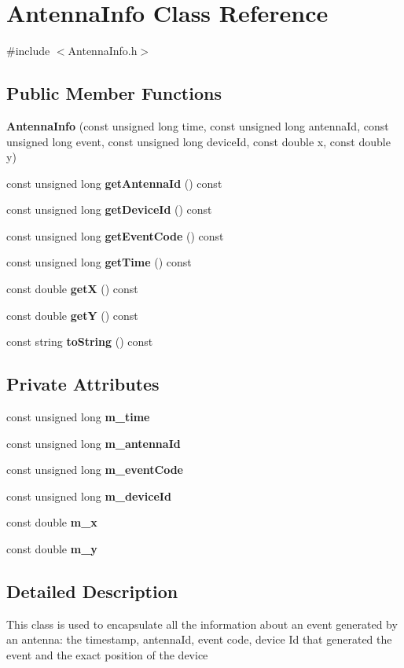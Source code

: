 \section{Antenna\+Info Class Reference}
\label{class_antenna_info}


{\ttfamily \#include $<$Antenna\+Info.\+h$>$}

\subsection*{Public Member Functions}
\begin{DoxyCompactItemize}
\item 
\textbf{ Antenna\+Info} (const unsigned long time, const unsigned long antenna\+Id, const unsigned long event, const unsigned long device\+Id, const double x, const double y)
\item 
const unsigned long \textbf{ get\+Antenna\+Id} () const
\item 
const unsigned long \textbf{ get\+Device\+Id} () const
\item 
const unsigned long \textbf{ get\+Event\+Code} () const
\item 
const unsigned long \textbf{ get\+Time} () const
\item 
const double \textbf{ getX} () const
\item 
const double \textbf{ getY} () const
\item 
const string \textbf{ to\+String} () const
\end{DoxyCompactItemize}
\subsection*{Private Attributes}
\begin{DoxyCompactItemize}
\item 
const unsigned long \textbf{ m\+\_\+time}
\item 
const unsigned long \textbf{ m\+\_\+antenna\+Id}
\item 
const unsigned long \textbf{ m\+\_\+event\+Code}
\item 
const unsigned long \textbf{ m\+\_\+device\+Id}
\item 
const double \textbf{ m\+\_\+x}
\item 
const double \textbf{ m\+\_\+y}
\end{DoxyCompactItemize}


\subsection{Detailed Description}
This class is used to encapsulate all the information about an event generated by an antenna\+: the timestamp, antenna\+Id, event code, device Id that generated the event and the exact position of the device 

